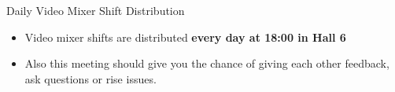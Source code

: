 
\begin{frame}{Daily Video Mixer Shift Distribution}
	\begin{itemize}
		\item Video mixer shifts are distributed \textbf{every day at 18:00 in Hall 6}
		\item Also this meeting should give you the chance of giving each other feedback, ask questions or rise issues.
	\end{itemize}
\end{frame}
